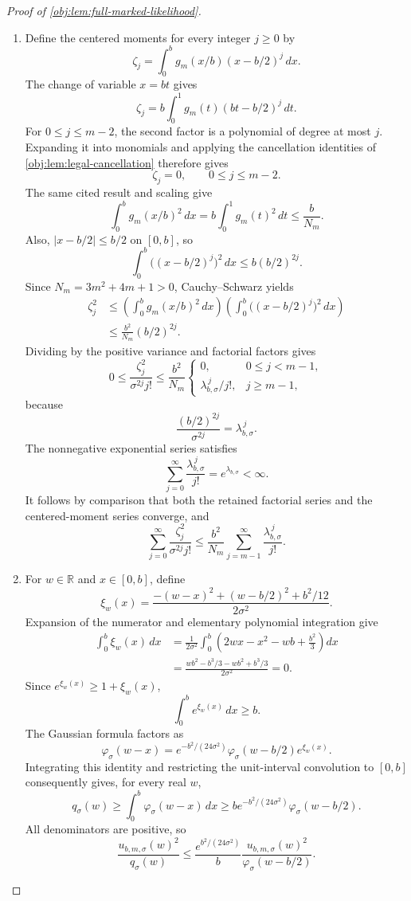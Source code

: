 \begin{proof}[Proof of \cref{obj:lem:full-marked-likelihood}]
\begin{enumerate}
\item Define the centered moments for every integer \(j\ge0\) by
\[
\zeta_j
=
\int_0^b g_m(x/b)(x-b/2)^j\,dx.
\]
The change of variable \(x=bt\) gives
\[
\zeta_j
=b\int_0^1g_m(t)(bt-b/2)^j\,dt.
\]
For \(0\le j\le m-2\), the second factor is a polynomial of degree at most \(j\). Expanding it into monomials and applying the cancellation identities of \cref{obj:lem:legal-cancellation} therefore gives
\[
\zeta_j=0,\qquad 0\le j\le m-2.
\]
The same cited result and scaling give
\[
\int_0^b g_m(x/b)^2\,dx
=b\int_0^1g_m(t)^2\,dt
\le\frac b{N_m}.
\]
Also, \(|x-b/2|\le b/2\) on \([0,b]\), so
\[
\int_0^b\bigl((x-b/2)^j\bigr)^2\,dx
\le b(b/2)^{2j}.
\]
Since \(N_m=3m^2+4m+1>0\), Cauchy--Schwarz yields
\[
\begin{aligned}
\zeta_j^2
&\le
\left(\int_0^b g_m(x/b)^2\,dx\right)
\left(\int_0^b\bigl((x-b/2)^j\bigr)^2\,dx\right)\\
&\le\frac{b^2}{N_m}(b/2)^{2j}.
\end{aligned}
\]
Dividing by the positive variance and factorial factors gives
\[
0\le\frac{\zeta_j^2}{\sigma^{2j}j!}
\le
\frac{b^2}{N_m}
\begin{cases}
0,&0\le j<m-1,\\
\lambda_{b,\sigma}^{\,j}/j!,&j\ge m-1,
\end{cases}
\]
because
\[
\frac{(b/2)^{2j}}{\sigma^{2j}}
=\lambda_{b,\sigma}^{\,j}.
\]
The nonnegative exponential series satisfies
\[
\sum_{j=0}^{\infty}\frac{\lambda_{b,\sigma}^{\,j}}{j!}
=e^{\lambda_{b,\sigma}}<\infty.
\]
It follows by comparison that both the retained factorial series and the centered-moment series converge, and
\[
\sum_{j=0}^{\infty}\frac{\zeta_j^2}{\sigma^{2j}j!}
\le
\frac{b^2}{N_m}
\sum_{j=m-1}^{\infty}\frac{\lambda_{b,\sigma}^{\,j}}{j!}.
\]

\item For \(w\in\mathbb R\) and \(x\in[0,b]\), define
\[
\xi_w(x)
=
\frac{-(w-x)^2+(w-b/2)^2+b^2/12}{2\sigma^2}.
\]
Expansion of the numerator and elementary polynomial integration give
\[
\begin{aligned}
\int_0^b\xi_w(x)\,dx
&=\frac1{2\sigma^2}
  \int_0^b\left(2wx-x^2-wb+\frac{b^2}{3}\right)dx\\
&=\frac{wb^2-b^3/3-wb^2+b^3/3}{2\sigma^2}
=0.
\end{aligned}
\]
Since \(e^{\xi_w(x)}\ge1+\xi_w(x)\),
\[
\int_0^b e^{\xi_w(x)}\,dx\ge b.
\]
The Gaussian formula factors as
\[
\varphi_\sigma(w-x)
=
e^{-b^2/(24\sigma^2)}
\varphi_\sigma(w-b/2)e^{\xi_w(x)}.
\]
Integrating this identity and restricting the unit-interval convolution to \([0,b]\) consequently gives, for every real \(w\),
\[
q_\sigma(w)
\ge\int_0^b\varphi_\sigma(w-x)\,dx
\ge
b e^{-b^2/(24\sigma^2)}\varphi_\sigma(w-b/2).
\]
All denominators are positive, so
\[
\frac{u_{b,m,\sigma}(w)^2}{q_\sigma(w)}
\le
\frac{e^{b^2/(24\sigma^2)}}b
\frac{u_{b,m,\sigma}(w)^2}{\varphi_\sigma(w-b/2)}.
\]


\end{enumerate}
\end{proof}
